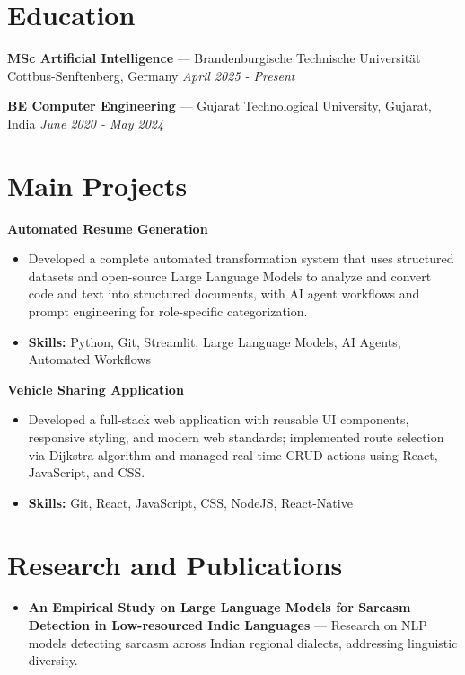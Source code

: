 \documentclass[a4paper,10pt]{article}
\begin{document}
\section*{Education}
\textbf{MSc Artificial Intelligence} — Brandenburgische Technische Universität Cottbus-Senftenberg, Germany \hfill \textit{April 2025 - Present}\par
\vspace{1.5pt}
\textbf{BE Computer Engineering} — Gujarat Technological University, Gujarat, India \hfill \textit{June 2020 - May 2024}\par

\section*{Main Projects}
\textbf{Automated Resume Generation}\par
\vspace{1pt}
\begin{itemize}
  \item Developed a complete automated transformation system that uses structured datasets and open-source Large Language Models to analyze and convert code and text into structured documents, with AI agent workflows and prompt engineering for role-specific categorization.
  \item \textbf{Skills:} Python, Git, Streamlit, Large Language Models, AI Agents, Automated Workflows
\end{itemize}
\vspace{3pt}
\textbf{Vehicle Sharing Application}\par
\vspace{1pt}
\begin{itemize}
  \item Developed a full-stack web application with reusable UI components, responsive styling, and modern web standards; implemented route selection via Dijkstra algorithm and managed real-time CRUD actions using React, JavaScript, and CSS.
  \item \textbf{Skills:} Git, React, JavaScript, CSS, NodeJS, React-Native
\end{itemize}

\section*{Research and Publications}
\begin{itemize}
\item \textbf{An Empirical Study on Large Language Models for Sarcasm Detection in Low-resourced Indic Languages} — Research on NLP models detecting sarcasm across Indian regional dialects, addressing linguistic diversity.
\end{itemize}
\end{document}
